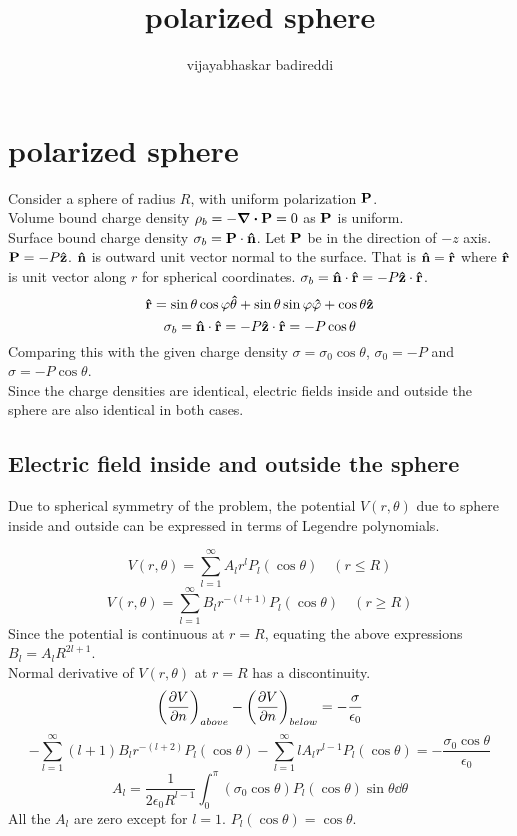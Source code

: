\documentclass[12pt]{article}
\title{polarized sphere}
\author{vijayabhaskar badireddi}
\begin{document}
\section*{polarized sphere}
Consider a sphere of radius $R$, with uniform polarization $\vb{P}$.\\Volume bound charge density $\rho_b=-\div{\vb{P}}=0$ as $\vb{P}$ is uniform.\\ Surface bound charge density $\sigma_b=\vb{P}\cdot\vu{n}$. Let $\vb{P}$ be in the direction of $-z$ axis. $\vb{P}=-P\vu{z}$. $\vu{n}$ is outward unit vector normal to the surface. That is $\vu{n}=\vu{r}$ where $\vu{r}$ is unit vector along $r$ for spherical coordinates. $\sigma_b=\vu{n}\cdot\vu{r}=-P\vu{z}\cdot\vu{r}$.\[\vu{r}=\sin\theta\cos\varphi\vu{\theta}+\sin\theta\sin\varphi\vu{\varphi}+\cos\theta\vu{z}\]
\[\sigma_b=\vu{n}\cdot\vu{r}=-P\vu{z}\cdot\vu{r}=-P\cos\theta\]
Comparing this with the given charge density $\sigma=\sigma_0\cos\theta$, $\sigma_0=-P$ and $\sigma=-P\cos\theta$.\\
Since the charge densities are identical, electric fields inside and outside the sphere are also identical in both cases.\\
\subsection*{Electric field inside and outside the sphere}
Due to spherical symmetry of the problem, the potential $V(r,\theta)$ due to sphere inside and outside can be expressed in terms of Legendre polynomials.

\[V(r,\theta)=\sum_{l=1}^{\infty}A_lr^lP_l(\cos\theta)\quad(r\leq R)\]
\[V(r,\theta)=\sum_{l=1}^{\infty}B_lr^{-(l+1)}P_l(\cos\theta)\quad(r\geq R)\]
Since the potential is continuous at $r=R$, equating the above expressions $B_l=A_lR^{2l+1}$.\\
Normal derivative of $V(r,\theta)$ at $r=R$ has a discontinuity.
\[\qty(\pdv{V}{n})_{above}-\qty(\pdv{V}{n})_{below}=-\frac{\sigma}{\epsilon_0}\]
\[-\sum_{l=1}^{\infty}(l+1)B_lr^{-(l+2)}P_l(\cos\theta)-\sum_{l=1}^{\infty}lA_lr^{l-1}P_l(\cos\theta)=-\frac{\sigma_0\cos\theta}{\epsilon_0}\]
\[A_l=\frac{1}{2\epsilon_0R^{l-1}}\int_0^{\pi}(\sigma_0\cos\theta)P_l(\cos\theta)\sin\theta\dd\theta\]
All the $A_l$ are zero except for $l=1$. $P_l(\cos\theta)=\cos\theta$.
\end{document}
